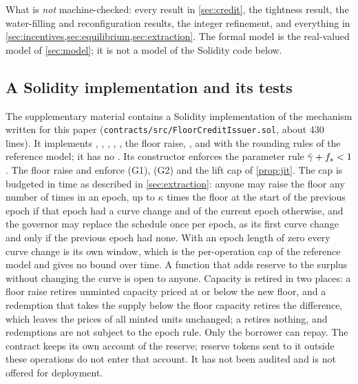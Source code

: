 What is \emph{not} machine-checked: every result in \cref{sec:credit}, the tightness result, the water-filling and reconfiguration results, the integer refinement, and everything in \cref{sec:incentives,sec:equilibrium,sec:extraction}. The formal model is the real-valued model of \cref{sec:model}; it is not a model of the Solidity code below.

\subsection{A Solidity implementation and its tests}\label{sec:solidity}

The supplementary material contains a Solidity implementation of the mechanism written for this paper (\texttt{contracts/src/FloorCreditIssuer.sol}, about 430 lines). It implements , , , , , the floor raise, ,  and  with the rounding rules of the reference model; it has no . Its constructor enforces the parameter rule $\bar\gamma+f_s<1$. The floor raise and  enforce (G1), (G2) and the lift cap of \cref{prop:jit}. The cap is budgeted in time as described in \cref{sec:extraction}: anyone may raise the floor any number of times in an epoch, up to $\kappa$ times the floor at the start of the previous epoch if that epoch had a curve change and of the current epoch otherwise, and the governor may replace the schedule once per epoch, as its first curve change and only if the previous epoch had none. With an epoch length of zero every curve change is its own window, which is the per-operation cap of the reference model and gives no bound over time. A function that adds reserve to the surplus without changing the curve is open to anyone. Capacity is retired in two places: a floor raise retires unminted capacity priced at or below the new floor, and a redemption that takes the supply below the floor capacity retires the difference, which leaves the prices of all minted units unchanged; a  retires nothing, and redemptions are not subject to the epoch rule. Only the borrower can repay. The contract keeps its own account of the reserve; reserve tokens sent to it outside these operations do not enter that account. It has not been audited and is not offered for deployment.

